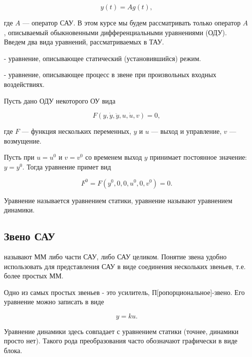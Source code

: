 \documentclass[../../TAU.tex]{subfiles}
\begin{document}
    \begin{equation}
        y(t) = A g(t),
    \end{equation}
    
    где $A$ --- оператор САУ. В этом курсе мы будем рассматривать только оператор $A$, описываемый обыкновенными дифференциальными уравнениями (ОДУ). Введем два вида уравнений, рассматриваемых в ТАУ.

     - уравнение, описывающее статический (установившийся) режим.
    
     - уравнение, описывающее процесс в звене при произвольных входных воздействиях.

    Пусть дано ОДУ некоторого ОУ вида
    
    \begin{equation}\label{EQ_DYNAMIC}
        F(y,\dot y, \ddot y, u, \dot u, v) = 0,
    \end{equation}
    
    где $F$ --- функция нескольких переменных, $y$ и $u$ --- выход и управление, $v$ --- возмущение.

    Пусть при $u=u^0$ и $v=v^0$ со временем выход $y$ принимает постоянное значение: $y=y^0$. Тогда уравнение 
    примет вид
    
    \begin{equation}\label{EQ_STATIC}
        F^0=F(y^0, 0, 0, u^0, 0, v^0) = 0.
    \end{equation}
    
    Уравнение 
    называется уравнением статики, уравнение 
    называют уравнением динамики.

\subsection{Звено САУ} %

     называют ММ либо части САУ, либо САУ целиком. Понятие звена удобно использовать для представления САУ в виде соединения нескольких звеньев, т.е. более простых ММ.

    Одно из самых простых звеньев - это усилитель, П[ропорциональное]-звено. Его уравнение можно записать в виде
    
    \begin{equation}
        y = ku.
    \end{equation}
    
    Уравнение динамики здесь совпадает с уравнением статики (точнее, динамики просто нет). Такого рода преобразования часто обозначают графически в виде блока.
\end{document}
